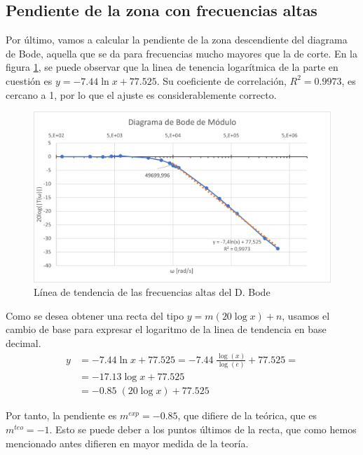 \subsection{Pendiente de la zona con frecuencias altas}
Por último, vamos a calcular la pendiente de la zona descendiente del diagrama de Bode, aquella que se da para frecuencias mucho mayores que la de corte. En la figura \ref{fig:LinTen}, se puede observar que la linea de tenencia logarítmica de la parte en cuestión es $y=-7.44\ln{x} + 77.525$. Su coeficiente de correlación, $R^2 = 0.9973$, es cercano a 1, por lo que el ajuste es considerablemente correcto.

\begin{figure}
    \centering
    \includegraphics[width=13.5cm]{Imágenes 03/Linea_Tendencia.png}
    \caption{Línea de tendencia de las frecuencias altas del D. Bode}
    \label{fig:LinTen}
\end{figure}

Como se desea obtener una recta del tipo $y=m(20\log x)+n$, usamos el cambio de base para expresar el logaritmo de la linea de tendencia en base decimal.
\begin{equation}
\begin{split}
    y & = -7.44 \ln{x} + 77.525 = -7.44 \; \frac{\log(x)}{\log(e)} + 77.525 = \\
      & = -17.13 \log x + 77.525   \\
      & = -0.85 \; (20 \log x)+77.525
\end{split}
\end{equation}

Por tanto, la pendiente es $m^{exp}=-0.85$, que difiere de la teórica, que es $m^{teo} = -1$. Esto se puede deber a los puntos últimos de la recta, que como hemos mencionado antes difieren en mayor medida de la teoría.


